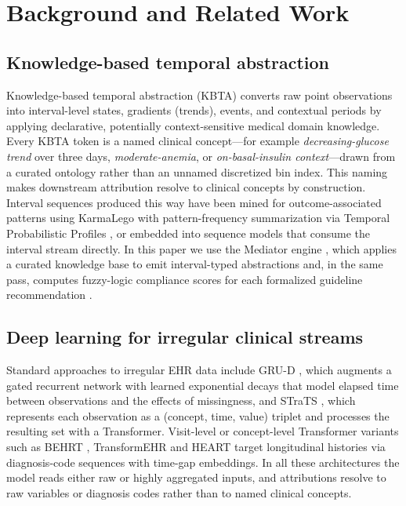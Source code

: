 \section{Background and Related Work}
\label{sec:background}

\subsection{Knowledge-based temporal abstraction}

Knowledge-based temporal abstraction (KBTA) \citep{shahar1997framework}
converts raw point observations into interval-level states, gradients
(trends), events, and contextual periods by applying declarative,
potentially context-sensitive medical domain knowledge. Every KBTA token
is a named clinical concept---for example \emph{decreasing-glucose trend}
over three days, \emph{moderate-anemia}, or \emph{on-basal-insulin
context}---drawn from a curated ontology rather than an unnamed
discretized bin index. This naming makes downstream attribution resolve
to clinical concepts by construction. Interval sequences produced this way
have been mined for outcome-associated patterns using KarmaLego
\citep{moskovitch2015karmalego} with pattern-frequency summarization via
Temporal Probabilistic Profiles \citep{sheetrit2019tpf}, or embedded into
sequence models that consume the interval stream directly. In this paper
we use the Mediator engine \citep{mediator-github}, which applies a curated
knowledge base to emit interval-typed abstractions and, in the same pass,
computes fuzzy-logic compliance scores for each formalized guideline
recommendation \citep{oded2027kineret-jbi}.

\subsection{Deep learning for irregular clinical streams}

Standard approaches to irregular EHR data include GRU-D
\citep{che2018recurrent}, which augments a gated recurrent network with
learned exponential decays that model elapsed time between observations
and the effects of missingness, and STraTS \citep{tipirneni2022strats},
which represents each observation as a (concept, time, value) triplet and
processes the resulting set with a Transformer. Visit-level or
concept-level Transformer variants such as BEHRT \citep{li2020behrt},
TransformEHR \citep{yang2023transformehr} and HEART
\citep{huang2024heart} target longitudinal histories via
diagnosis-code sequences with time-gap embeddings. In all these
architectures the model reads either raw or highly aggregated inputs,
and attributions resolve to raw variables or diagnosis codes rather than
to named clinical concepts.

